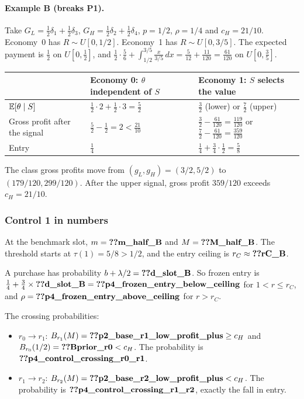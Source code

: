 \paragraph{Example B (breaks P1).} Take
\(G_L=\tfrac12\delta_1+\tfrac12\delta_3\), \(G_H=\tfrac12\delta_2+\tfrac12\delta_4\), \(p=1/2\), \(\rho=1/4\) and
\(c_H=21/10\). Economy~0 has \(R\sim U[0,1/2]\). Economy~1 has \(R\sim U[0,3/5]\). The expected payment is
\(\tfrac12\) on \(U[0,\tfrac12]\), and
\(\tfrac12\cdot\tfrac56+\int_{1/2}^{3/5}\tfrac{x}{3/5}\,dx=\tfrac5{12}+\tfrac{11}{120}=\tfrac{61}{120}\) on \(U[0,\tfrac35]\).
\begin{center}\small
\begin{tabularx}{\linewidth}{@{}lXX@{}}
\toprule
 & Economy 0: \(\theta\) independent of \(S\) & Economy 1: \(S\) selects the value\\
\midrule
\(\mathbb{E}[\theta\mid S]\) & \(\tfrac12\cdot2+\tfrac12\cdot3=\tfrac52\) & \(\tfrac32\) (lower) or \(\tfrac72\) (upper)\\
Gross profit after the signal & \(\tfrac52-\tfrac12=2<\tfrac{21}{10}\) &
\(\tfrac32-\tfrac{61}{120}=\tfrac{119}{120}\) or \(\tfrac72-\tfrac{61}{120}=\tfrac{359}{120}\)\\
Entry & \(\tfrac14\) & \(\tfrac14+\tfrac34\cdot\tfrac12=\tfrac58\)\\
\bottomrule
\end{tabularx}
\end{center}
The class gross profits move from \((g_L,g_H)=(3/2,5/2)\) to \((179/120,299/120)\). After the upper signal, gross
profit \(359/120\) exceeds \(c_H=21/10\).

\subsubsection{Control 1 in numbers}

At the benchmark slot, \(m=\reg{m_half_B}\) and \(M=\reg{M_half_B}\). The threshold starts at \(\tau(1)=5/8>1/2\), and
the entry ceiling is \(r_C\approx\reg{rC_B}\).

A purchase has probability \(b+\lambda/2=\reg{d_slot_B}\). So frozen entry is
\(\tfrac14+\tfrac34\times\reg{d_slot_B}=\reg{p4_frozen_entry_below_ceiling}\) for \(1<r\le r_C\), and
\(\rho=\reg{p4_frozen_entry_above_ceiling}\) for \(r>r_C\).

The crossing probabilities:
\begin{itemize}[leftmargin=2em]
\item \(r_0\to r_1\): \(B_{r_1}(M)=\reg{p2_base_r1_low_profit_plus}\ge c_H\) and \(B_{r_0}(1/2)=\reg{Bprior_r0}<c_H\).
The probability is \(\reg{p4_control_crossing_r0_r1}\).
\item \(r_1\to r_2\): \(B_{r_2}(M)=\reg{p2_base_r2_low_profit_plus}<c_H\). The probability is
\(\reg{p4_control_crossing_r1_r2}\), exactly the fall in entry.
\end{itemize}

